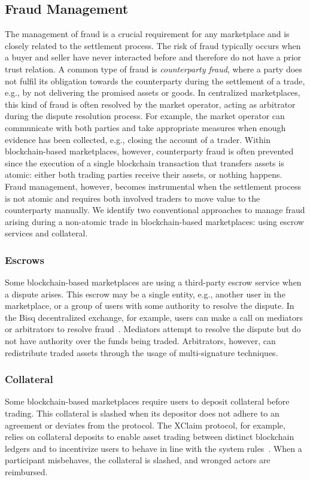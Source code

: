 \subsection{Fraud Management}
The management of fraud is a crucial requirement for any marketplace and is closely related to the settlement process.
The risk of fraud typically occurs when a buyer and seller have never interacted before and therefore do not have a prior trust relation.
A common type of fraud is \emph{counterparty fraud}, where a party does not fulfil its obligation towards the counterparty during the settlement of a trade, e.g., by not delivering the promised assets or goods.
In centralized marketplaces, this kind of fraud is often resolved by the market operator, acting as arbitrator during the dispute resolution process.
For example, the market operator can communicate with both parties and take appropriate measures when enough evidence has been collected, e.g., closing the account of a trader.
Within blockchain-based marketplaces, however, counterparty fraud is often prevented since the execution of a single blockchain transaction that transfers assets is atomic: either both trading parties receive their assets, or nothing happens.
Fraud management, however, becomes instrumental when the settlement process is not atomic and requires both involved traders to move value to the counterparty manually. %
We identify two conventional approaches to manage fraud arising during a non-atomic trade in blockchain-based marketplaces: using escrow services and collateral.

\subsubsection{Escrows}
Some blockchain-based marketplaces are using a third-party escrow service when a dispute arises.
This escrow may be a single entity, e.g., another user in the marketplace, or a group of users with some authority to resolve the dispute.
In the Bisq decentralized exchange, for example, users can make a call on mediators or arbitrators to resolve fraud~\cite{bisq}.
Mediators attempt to resolve the dispute but do not have authority over the funds being traded.
Arbitrators, however, can redistribute traded assets through the usage of multi-signature techniques.

\subsubsection{Collateral}
Some blockchain-based marketplaces require users to deposit collateral before trading.
This collateral is slashed when its depositor does not adhere to an agreement or deviates from the protocol.
The XClaim protocol, for example, relies on collateral deposits to enable asset trading between distinct blockchain ledgers and to incentivize users to behave in line with the system rules~\cite{zamyatin2019xclaim}.
When a participant misbehaves, the collateral is slashed, and wronged actors are reimbursed.

